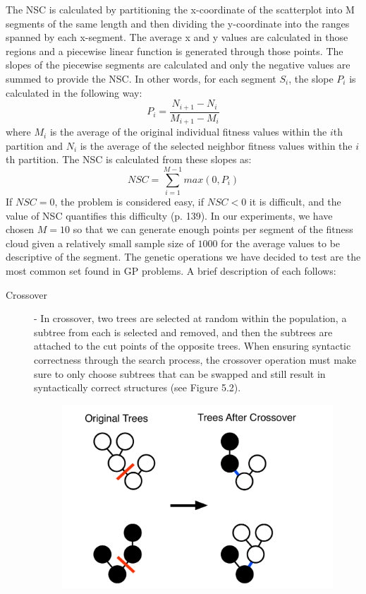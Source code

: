 \documentclass[a4paper,12pt]{report} 	%
\numberwithin{figure}{chapter}
\numberwithin{table}{chapter}
\numberwithin{equation}{chapter}
\begin{document}
\begin{flushleft}
The NSC is calculated by partitioning the x-coordinate of the scatterplot into M segments of the same length and then dividing the y-coordinate into the ranges spanned by each x-segment. The average x and y values are calculated in those regions and a piecewise linear function is generated through those points. The slopes of the piecewise segments are calculated and only the negative values are summed to provide the NSC. In other words, for each segment $S_i$, the slope $P_i$ is calculated in the following way:
\begin{equation}
P_i = \frac{N_{i+1}-N_i}{M_{i+1}-M_i}
\end{equation}
where $M_i$ is the average of the original individual fitness values within the $i$th partition and $N_i$ is the average of the selected neighbor fitness values within the $i$th partition. The NSC is calculated from these slopes as:
\begin{equation}
NSC = \sum_{i=1}^{M-1} max(0, P_i)
\end{equation}
If $NSC = 0$, the problem is considered easy, if $NSC < 0$ it is difficult, and the value of NSC quantifies this difficulty (p. 139). In our experiments, we have chosen $M=10$ so that we can generate enough points per segment of the fitness cloud given a relatively small sample size of $1000$ for the average values to be descriptive of the segment.
The genetic operations we have decided to test are the most common set found in GP problems. A brief description of each follows:
\begin{description}
\item [Crossover] - In crossover, two trees are selected at random within the population, a subtree from each is selected and removed, and then the subtrees are attached to the cut points of the opposite trees. When ensuring syntactic correctness through the search process, the crossover operation must make sure to only choose subtrees that can be swapped and still result in syntactically correct structures (see Figure 5.2). 
\begin{figure}[h!]
\begin{center}
\includegraphics[scale=0.5]{Crossover}

\end{center}
\end{figure}
\end{description}
\end{flushleft}
\end{document}
